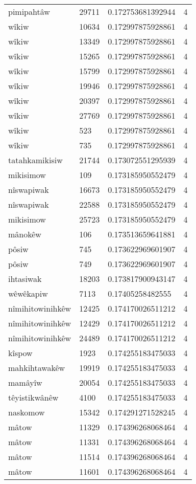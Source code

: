 \begin{longtable}{llll}
pimipahtâw & 29711 & 0.172753681392944 & 4 \\
wîkiw & 10634 & 0.172997875928861 & 4 \\
wîkiw & 13349 & 0.172997875928861 & 4 \\
wîkiw & 15265 & 0.172997875928861 & 4 \\
wîkiw & 15799 & 0.172997875928861 & 4 \\
wîkiw & 19946 & 0.172997875928861 & 4 \\
wîkiw & 20397 & 0.172997875928861 & 4 \\
wîkiw & 27769 & 0.172997875928861 & 4 \\
wîkiw & 523 & 0.172997875928861 & 4 \\
wîkiw & 735 & 0.172997875928861 & 4 \\
tatahkamikisiw & 21744 & 0.173072551295939 & 4 \\
mikisimow & 109 & 0.173185950552479 & 4 \\
nîswapiwak & 16673 & 0.173185950552479 & 4 \\
nîswapiwak & 22588 & 0.173185950552479 & 4 \\
mikisimow & 25723 & 0.173185950552479 & 4 \\
mânokêw & 106 & 0.173513659641881 & 4 \\
pôsiw & 745 & 0.173622969601907 & 4 \\
pôsiw & 749 & 0.173622969601907 & 4 \\
ihtasiwak & 18203 & 0.173817900943147 & 4 \\
wêwêkapiw & 7113 & 0.17405258482555 & 4 \\
nîmihitowinihkêw & 12425 & 0.174170026511212 & 4 \\
nîmihitowinihkêw & 12429 & 0.174170026511212 & 4 \\
nîmihitowinihkêw & 24489 & 0.174170026511212 & 4 \\
kîspow & 1923 & 0.174255183475033 & 4 \\
mahkihtawakêw & 19919 & 0.174255183475033 & 4 \\
mamâyîw & 20054 & 0.174255183475033 & 4 \\
têyistikwânêw & 4100 & 0.174255183475033 & 4 \\
naskomow & 15342 & 0.174291271528245 & 4 \\
mâtow & 11329 & 0.174396268068464 & 4 \\
mâtow & 11331 & 0.174396268068464 & 4 \\
mâtow & 11514 & 0.174396268068464 & 4 \\
mâtow & 11601 & 0.174396268068464 & 4 \\

\end{longtable}
